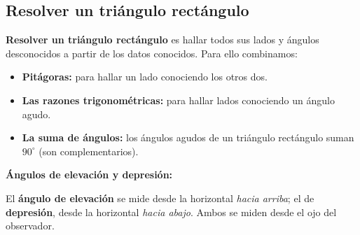 \documentclass[12pt, letterpaper]{article}
\begin{document}
\subsection{Resolver un triángulo rectángulo}

\begin{cuadroteoria}
  \textbf{Resolver un triángulo rectángulo} es hallar todos sus lados y ángulos desconocidos a partir de los datos conocidos. Para ello combinamos:
  \begin{itemize}[leftmargin=*]
    \item \textbf{Pitágoras:} para hallar un lado conociendo los otros dos.
    \item \textbf{Las razones trigonométricas:} para hallar lados conociendo un ángulo agudo.
    \item \textbf{La suma de ángulos:} los ángulos agudos de un triángulo rectángulo suman $90^{\circ}$ (son complementarios).
  \end{itemize}
\end{cuadroteoria}

\begin{cuadroteoria}
  \textbf{Ángulos de elevación y depresión:}
  \begin{center}
  \end{center}
  El \textbf{ángulo de elevación} se mide desde la horizontal \emph{hacia arriba}; el de \textbf{depresión}, desde la horizontal \emph{hacia abajo}. Ambos se miden desde el ojo del observador.
\end{cuadroteoria}
\end{document}
